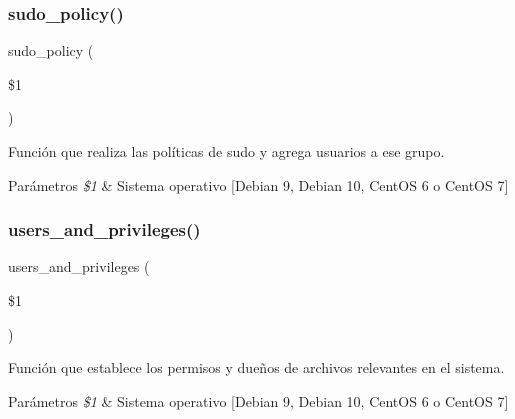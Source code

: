 \subsubsection{\texorpdfstring{sudo\+\_\+policy()}{sudo\_policy()}}
{\footnotesize\ttfamily sudo\+\_\+policy (\begin{DoxyParamCaption}\item[{}]{\$1 }\end{DoxyParamCaption})}



Función que realiza las políticas de sudo y agrega usuarios a ese grupo. 


\begin{DoxyParams}{Parámetros}
{\em \$1} & Sistema operativo \mbox{[}\textquotesingle{}Debian 9\textquotesingle{}, \textquotesingle{}Debian 10\textquotesingle{}, \textquotesingle{}Cent\+OS 6\textquotesingle{} o \textquotesingle{}Cent\+OS 7\textquotesingle{}\mbox{]} \\
\hline
\end{DoxyParams}
\mbox{\label{Configuraciones__Generales_8sh_a1fc4ba4932f2393664a8130399016a15}} 
\subsubsection{\texorpdfstring{users\+\_\+and\+\_\+privileges()}{users\_and\_privileges()}}
{\footnotesize\ttfamily users\+\_\+and\+\_\+privileges (\begin{DoxyParamCaption}\item[{}]{\$1 }\end{DoxyParamCaption})}



Función que establece los permisos y dueños de archivos relevantes en el sistema. 


\begin{DoxyParams}{Parámetros}
{\em \$1} & Sistema operativo \mbox{[}\textquotesingle{}Debian 9\textquotesingle{}, \textquotesingle{}Debian 10\textquotesingle{}, \textquotesingle{}Cent\+OS 6\textquotesingle{} o \textquotesingle{}Cent\+OS 7\textquotesingle{}\mbox{]} \\
\hline
\end{DoxyParams}
